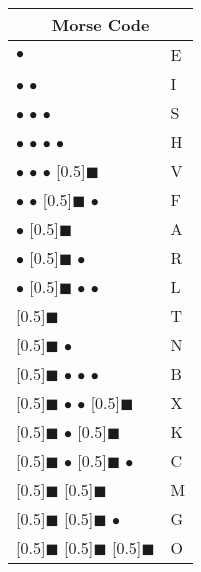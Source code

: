 \documentclass[11pt]{article}
\newcommand{\MorseDot}{$\bullet$ }
\newcommand{\MorseDash}{\scalebox{1.5}[0.5]{$\blacksquare$} }
\begin{document}
\begin{multicols}{3}
\begin{tabular}{|ll|}
\hline
\multicolumn{2}{|c|}{Morse Code} \\
\hline
\MorseDot & E \\
\MorseDot\MorseDot & I \\
\MorseDot\MorseDot\MorseDot & S \\
\MorseDot\MorseDot\MorseDot\MorseDot & H \\
\MorseDot\MorseDot\MorseDot\MorseDash & V \\
\MorseDot\MorseDot\MorseDash\MorseDot & F \\
\MorseDot\MorseDash & A \\
\MorseDot\MorseDash\MorseDot & R \\
\MorseDot\MorseDash\MorseDot\MorseDot & L \\
\MorseDash & T \\
\MorseDash\MorseDot & N \\
\MorseDash\MorseDot\MorseDot\MorseDot & B \\
\MorseDash\MorseDot\MorseDot\MorseDash & X \\
\MorseDash\MorseDot\MorseDash & K \\
\MorseDash\MorseDot\MorseDash\MorseDot & C \\
\MorseDash\MorseDash & M \\
\MorseDash\MorseDash\MorseDot & G \\
\MorseDash\MorseDash\MorseDash & O \\
\hline
\end{tabular}


\end{multicols}
\end{document}
